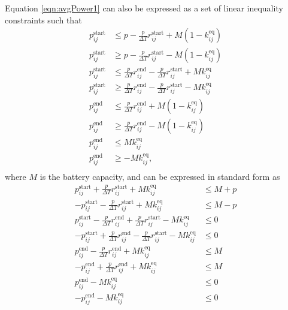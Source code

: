 Equation \eqref{eqn:avgPower1} can also be expressed as a set of linear inequality constraints such that
\begin{equation} \begin{aligned}
	p_{ij}^{\text{start}} &\le p - \frac{p}{\Delta T}r_{ij}^{\text{start}} + M\left ( 1 - k_{ij}^{\text{eq}} \right ) \\
	p_{ij}^{\text{start}} &\ge p - \frac{p}{\Delta T}r_{ij}^{\text{start}} - M\left ( 1 - k_{ij}^{\text{eq}} \right ) \\ 
	p_{ij}^{\text{start}} &\le \frac{p}{\Delta T}r_{ij}^{\text{end}} - \frac{p}{\Delta T}r_{ij}^{\text{start}} + Mk_{ij}^{\text{eq}}\\
	p_{ij}^{\text{start}} &\ge \frac{p}{\Delta T}r_{ij}^{\text{end}} - \frac{p}{\Delta T}r_{ij}^{\text{start}} - Mk_{ij}^{\text{eq}}\\ 
	p_{ij}^{\text{end}}   &\le \frac{p}{\Delta T}r_{ij}^{\text{end}} + M\left ( 1 - k_{ij}^{\text{eq}} \right )\\
	p_{ij}^{\text{end}}   &\ge \frac{p}{\Delta T}r_{ij}^{\text{end}} - M\left ( 1 - k_{ij}^{\text{eq}} \right )\\
	p_{ij}^{\text{end}}   &\le Mk_{ij}^{\text{eq}}\\
	p_{ij}^{\text{end}}   &\ge - Mk_{ij}^{\text{eq}},\\
\end{aligned} \end{equation}
where $M$ is the battery capacity, and can be expressed in standard form as
\begin{equation} \begin{aligned}
	 p_{ij}^{\text{start}} + \frac{p}{\Delta T} r_{ij}^{\text{start}} + Mk_{ij}^{\text{eq}} &\le M + p \\
	-p_{ij}^{\text{start}} - \frac{p}{\Delta T} r_{ij}^{\text{start}} + Mk_{ij}^{\text{eq}} &\le M - p \\
	 p_{ij}^{\text{start}} - \frac{p}{\Delta T} r_{ij}^{\text{end}}  + \frac{p}{\Delta T}r_{ij}^{\text{start}} - Mk_{ij}^{\text{eq}} &\le 0\\
	-p_{ij}^{\text{start}} + \frac{p}{\Delta T} r_{ij}^{\text{end}}  - \frac{p}{\Delta T}r_{ij}^{\text{start}} - Mk_{ij}^{\text{eq}} &\le 0\\
	 p_{ij}^{\text{end}}   - \frac{p}{\Delta T} r_{ij}^{\text{end}} + Mk_{ij}^{\text{eq}} &\le M \\
	-p_{ij}^{\text{end}}   + \frac{p}{\Delta T} r_{ij}^{\text{end}} + Mk_{ij}^{\text{eq}} &\le M \\
	 p_{ij}^{\text{end}}   - Mk_{ij}^{\text{eq}} &\le 0\\
	-p_{ij}^{\text{end}}   - Mk_{ij}^{\text{eq}}&\le 0 \\
\end{aligned} \end{equation}
